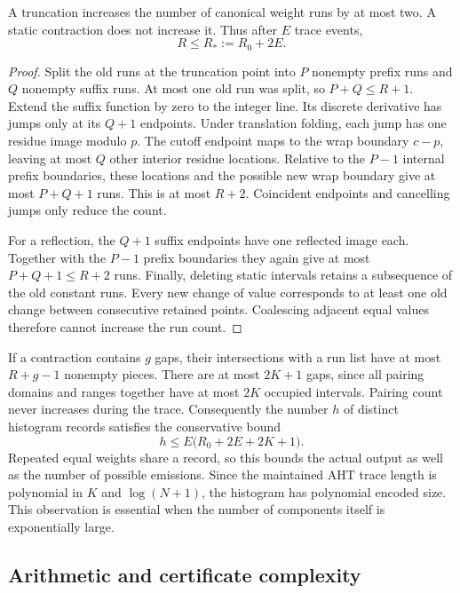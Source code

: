 \begin{lemma}
\label{lem:weighted-run-growth}
A truncation increases the number of canonical weight runs by at most two.
A static contraction does not increase it. Thus after $E$ trace events,
\[
 R\le R_*:=R_0+2E.
\]
\end{lemma}
\begin{proof}
Split the old runs at the truncation point into $P$ nonempty prefix runs and
$Q$ nonempty suffix runs. At most one old run was split, so
$P+Q\le R+1$. Extend the suffix function by zero to the integer line. Its
discrete derivative has jumps only at its $Q+1$ endpoints. Under translation
folding, each jump has one residue image modulo $p$. The cutoff endpoint
maps to the wrap boundary $c-p$, leaving at most $Q$ other interior residue
locations. Relative to the $P-1$ internal prefix boundaries, these locations
and the possible new wrap boundary give at most $P+Q+1$ runs. This is at most
$R+2$. Coincident endpoints and cancelling jumps only reduce the count.

For a reflection, the $Q+1$ suffix endpoints have one reflected image each.
Together with the $P-1$ prefix boundaries they again give at most
$P+Q+1\le R+2$ runs. Finally, deleting static intervals retains a subsequence
of the old constant runs. Every new change of value corresponds to at least
one old change between consecutive retained points. Coalescing adjacent equal
values therefore cannot increase the run count.
\end{proof}

If a contraction contains $g$ gaps, their intersections with a run list have
at most $R+g-1$ nonempty pieces. There are at most $2K+1$ gaps, since all
pairing domains and ranges together have at most $2K$ occupied intervals.
Pairing count never increases during the trace. Consequently the number $h$
of distinct histogram records satisfies the conservative bound
\begin{equation}
 h\le E\bigl(R_0+2E+2K+1\bigr).
 \label{eq:weighted-output-bound}
\end{equation}
Repeated equal weights share a record, so this bounds the actual output as
well as the number of possible emissions. Since the maintained AHT trace
length is polynomial in $K$ and $\log(N+1)$, the histogram has polynomial
encoded size. This observation is essential when the number of components
itself is exponentially large.

\subsection{Arithmetic and certificate complexity}

